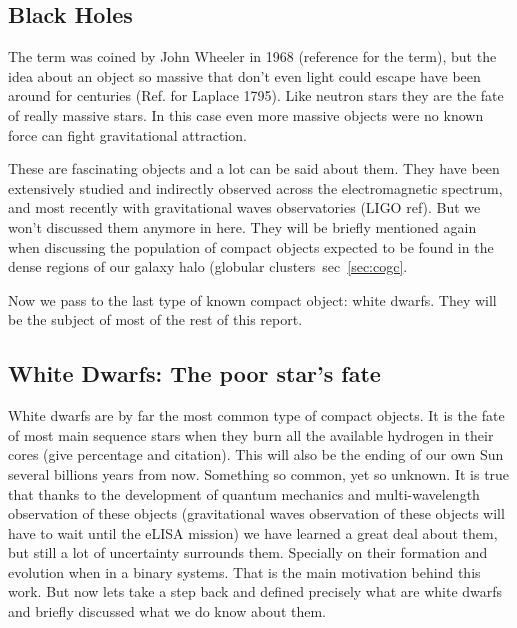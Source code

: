 \subsection{Black Holes}\label{sec:bh}

The term was coined by John Wheeler in 1968 (reference for the term), but the idea about an object so massive that don't even light could escape have been around for centuries (Ref. for Laplace 1795). Like neutron stars they are the fate of really massive stars. In this case even more massive objects were no known force can fight gravitational attraction. 

These are fascinating objects and a lot can be said about them. They have been extensively studied and indirectly observed across the electromagnetic spectrum, and most recently with gravitational waves observatories (LIGO ref). But we won't discussed them anymore in here. They will be briefly mentioned again when discussing the population of compact objects expected to be found in the dense regions of our galaxy halo (globular clusters~sec~\ref{sec:cogc}. 

Now we pass to the last type of known compact object: white dwarfs. They will be the subject of most of the rest of this report. 

\subsection[White Dwarfs]{White Dwarfs: The poor star's fate}\label{sec:wd} 

White dwarfs are by far the most common type of compact objects. It is the fate of most main sequence stars when they burn all the available hydrogen in their cores (give percentage and citation). This will also be the ending of our own Sun several billions years from now. Something so common, yet so unknown. It is true that thanks to the development of quantum mechanics and multi-wavelength observation of these objects (gravitational waves observation of these objects will have to wait until the eLISA mission) we have learned a great deal about them, but still a lot of uncertainty surrounds them. Specially on their formation and evolution when in a binary systems. That is the main motivation behind this work. But now lets take a step back and defined precisely what are white dwarfs and briefly discussed what we do know about them. 

